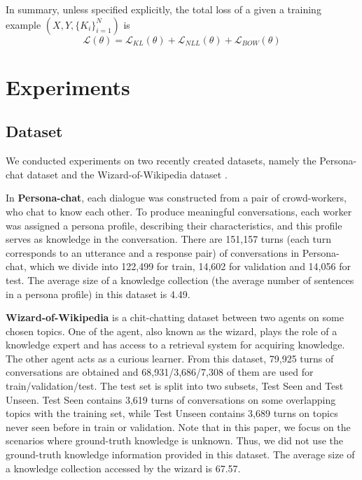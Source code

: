 \documentclass{article}
\begin{document}
In summary, unless specified explicitly,
the total loss of a given a training example $(X, Y, \{K_i\}_{i=1}^N)$ is
$$\mathcal{L}(\theta) = \mathcal{L}_{KL}(\theta) + \mathcal{L}_{NLL}(\theta)+ \mathcal{L}_{BOW}(\theta)$$

\section{Experiments}
\subsection{Dataset}
We conducted experiments on two recently created datasets,
namely
the Persona-chat dataset \cite{zhang2018personalizing} and the Wizard-of-Wikipedia dataset \cite{dinan2018wizard}.

\smallskip
\noindent
In \textbf{Persona-chat},
each dialogue was constructed from a pair of  crowd-workers,
who chat to know each other.
To produce meaningful conversations,
each worker was assigned a persona profile, describing their characteristics,
and this profile serves as knowledge in the conversation.
There are 151,157 turns (each turn corresponds to an utterance and a response pair) of conversations in Persona-chat,
which we divide into 122,499 for train, 14,602 for validation and 14,056 for test.
The average size of a knowledge collection (the average number of sentences in a persona profile) in this dataset is 4.49.

\smallskip
\noindent
\textbf{Wizard-of-Wikipedia} is a chit-chatting dataset between two agents on some chosen topics.
One of the agent, also known as the wizard, plays the role of a knowledge expert and has access to a retrieval system for acquiring knowledge.
The other agent acts as a curious learner.
From this dataset, 79,925 turns of conversations are obtained 
and 68,931/3,686/7,308 of them are used for train/validation/test.
The test set is split into two subsets, Test Seen and Test Unseen.
Test Seen contains 3,619 turns of conversations on some overlapping topics with the training set,
while Test Unseen contains 3,689 turns on topics never seen before in train or validation.
Note that in this paper, we focus on the scenarios where ground-truth knowledge is unknown.
Thus, we did not use the ground-truth knowledge information provided in this dataset.
The average size of a knowledge collection accessed by the wizard is 67.57.
\end{document}
